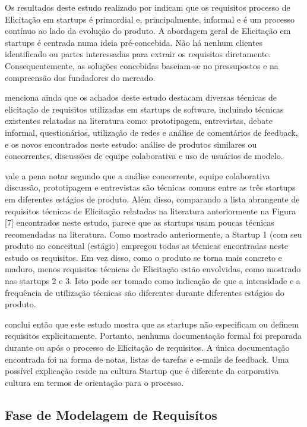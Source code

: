 Os resultados deste estudo realizado por \cite{rafiq2017requirements} indicam que os requisitos
processo de Elicitação em startups é primordial e, principalmente, informal e é um processo contínuo ao lado da evolução do produto. A abordagem geral de Elicitação em startups é centrada numa ideia pré-concebida. Não há nenhum 
clientes identificado ou partes interessadas para extrair os requisitos diretamente. Consequentemente, as soluções concebidas baseiam-se no pressupostos e na compreensão dos fundadores do mercado.

\cite{rafiq2017requirements} menciona ainda que os achados deste estudo destacam diversas técnicas de elicitação de requisitos utilizadas em startups de software, incluindo técnicas existentes relatadas na literatura como: prototipagem, entrevistas, debate informal, questionários, utilização de redes e análise de comentários de feedback, e os novos encontrados neste estudo: análise de produtos similares ou concorrentes, discussões de equipe colaborativa e uso de usuários de modelo.

vale a pena notar segundo \cite{rafiq2017requirements} que a análise concorrente, equipe colaborativa
discussão, prototipagem e entrevistas são técnicas comuns
entre as três startups em diferentes estágios de produto.
Além disso, comparando a lista abrangente de requisitos
técnicas de Elicitação relatadas na literatura anteriormente na Figura [7] encontrados neste estudo, parece que as startups usam poucas técnicas recomendadas na literatura. Como mostrado
anteriormente, a Startup 1 (com seu produto no conceitual
(estágio) empregou todas as técnicas encontradas neste estudo
os requisitos. Em vez disso, como o produto se torna mais
concreto e maduro, menos requisitos técnicas de Elicitação
estão envolvidas, como mostrado nas startups 2 e 3. Isto pode ser tomado como indicação de que a intensidade e a frequência de utilização técnicas são diferentes durante diferentes estágios do produto.

\cite{rafiq2017requirements} conclui então que este estudo mostra que as startups não especificam ou definem requisitos explicitamente. Portanto, nenhuma documentação formal foi preparada durante ou após o processo de Elicitação de requisitos. A única documentação encontrada foi na forma de
notas, listas de tarefas e e-mails de feedback. Uma possível explicação reside na cultura Startup que é diferente da corporativa cultura em termos de orientação para o processo.

\subsection{Fase de Modelagem de Requisítos}

